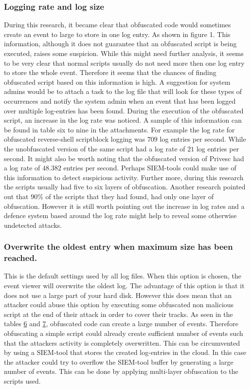 \documentclass{article}%
\begin{document}
\subsubsection{Logging rate and log size}
During this research, it became clear that obfuscated code would sometimes create an event to large to store in one log entry. As shown in figure 1. This information, although it does not guarantee that an obfuscated script is being executed, raises some suspicion. While this might need further analysis, it seems to be very clear that normal scripts usually do not need more then one log entry to store the whole event. Therefore it seems that the chances of finding obfuscated script based on this information is high. A suggestion for system admins would be to attach a task to the log file that will look for these types of occurrences and notify the system admin when an event that has been logged over multiple log-entries has been found.\newline
During the execution of the obfuscated script, an increase in the log rate was noticed. A sample of this information can be found in table six to nine in the attachments. For example the log rate for obfuscated reverse-shell scriptblock logging was $709$ log entries per second. While the unobfuscated version of the same script had a log rate of $21$ log entries per second. It might also be worth noting that the obfuscated version of Privesc had a log rate of $48.382$ entries per second.
Perhaps SIEM-tools could make use of this information to detect suspicious activity.
Further more, during this research the scripts usually had five to six layers of obfuscation. Another research pointed out that $90$\% of the scripts that they had found, had only one layer of obfuscation. However it is still worth pointing out the increase in log rates and a defence system based around the log rate might help to reveal some otherwise undetected attacks.
\subsubsection{Overwrite the oldest entry when maximum size has been reached.}
This is the default settings used by all log files. When this option is chosen, the event viewer will overwrite the oldest log. The advantage of this option is that it does not use a large part of your hard disk. However this does mean that an attacker could abuse this option by executing some obfuscated non malicious script at the end of their attack in order to cover their tracks. As seen in the tables \hyperlink{table6}{6} and \hyperlink{table7}{7}, obfuscated code can create a large number of events. Therefore obfuscating a simple script could already create sufficient number of events such that the attackers activity is completely overwritten. This can be circumvented by using a SIEM-tool that stores the created log-entries in the cloud. In this case the attacker could try to overflow the SIEM-tool buffer by generating a large number of events. This can be done by applying multi-layer obfuscation to the scripts used.
\end{document}
